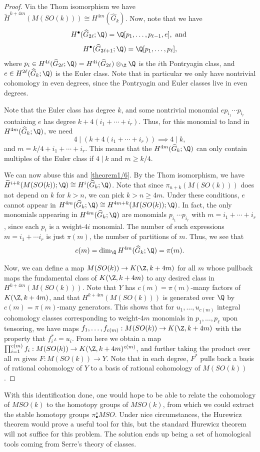 \begin{proof}
    Via the Thom isomorphism we have $\widetilde H^{k+4m}(M(SO(k)))\cong H^{4m}(\widehat G_k)$.
    Now, note that we have 
    \[H^\bullet(\widehat G_{2\ell};\Q)=\Q[p_1,\dots, p_{\ell-1},e],\text{ and }\]
    \[H^\bullet(\widehat G_{2\ell+1};\Q)=\Q[p_1,\dots, p_{\ell}],\]
    where $p_i\in H^{4i}(\widehat G_{2\ell};\Q)=H^{4i}(\widehat G_{2\ell})\otimes_\Z \Q$ is the $i$th Pontryagin class, and $e\in H^{2\ell}(\widehat G_k;\Q)$ is the Euler class. Note that in particular we only have nontrivial cohomology in even degrees, since the Pontryagin and Euler classes live in even degrees. 
    
    Note that the Euler class has degree $k$, and some nontrivial monomial $ep_{i_1}\cdots p_{i_r}$ containing $e$ has degree $k+4(i_1+\cdots +i_r)$. Thus, for this monomial to land in $H^{4m}(\widehat G_k;\Q)$, we need 
    \[4\mid (k+4(i_1+\cdots +i_r))\implies 4\mid k,\]
    and $m=k/4+i_1+\cdots+i_r$. This means that the $H^{4m}(\widehat G_k;\Q)$ can only contain multiples of the Euler class if $4\mid k$ and $m\geq k/4$.

    We can now abuse this and \cref{theorem1/6}. By the Thom isomorphism, we have $\widetilde H^{i+k}(M(SO(k));\Q)\cong H^i(\widehat G_k;\Q)$. Note that since $\pi_{n+k}(M(SO(k)))$ does not depend on $k$ for $k>n$, we can pick $k > n\geq 4m$. Under these conditions, $e$ cannot appear in $H^{4m}(\widehat G_k;\Q)\cong H^{4m+k}(M(SO(k));\Q)$. In fact, the only monomials appearing in $H^{4m}(\widehat G_k;\Q)$ are monomials $p_{i_1}\cdots p_{i_r}$ with $m=i_1+\cdots+i_r$, since each $p_i$ is a weight-$4i$ monomial. The number of such expressions $m=i_1+\cdots i_r$ is just $\pi(m)$, the number of partitions of $m$. Thus, we see that 
    \[c(m)=\dim_\Q H^{4m}(\widehat G_k;\Q)=\pi(m).\]

    Now, we can define a map $M(SO(k))\to K(\Z, k+4m)$ for all $m$ whose pullback maps the fundamental class of $K(\Z, k+4m)$ to any desired class in $H^{k+4m}(M(SO(k)))$. Note that $Y$ has $c(m)=\pi(m)$-many factors of $K(\Z, k+4m)$, and that $H^{k+4m}(M(SO(k)))$ is generated over $\Q$ by $c(m)=\pi(m)$-many generators. This shows that for $u_1,\dots, u_{c(m)}$ integral cohomology classes corresponding to weight-$4m$ monomials in $p_1,\dots, p_\ell$ upon tensoring, we have maps $f_1,\dots, f_{c(m)}:M(SO(k))\to K(\Z, k+4m)$ with the property that $f_i^*\iota=u_i$. From here we obtain a map $\prod_{i=1}^{c(m)} f_i:M(SO(k))\to K(\Z, k+4m)^{c(m)}$, and further taking the product over all $m$ gives $F:M(SO(k))\to Y$. Note that in each degree, $F^*$ pulls back a basis of rational cohomology of $Y$ to a basis of rational cohomology of $M(SO(k))$. 
\end{proof}
With this identification done, one would hope to be able to relate the cohomology of $MSO(k)$ to the homotopy groups of $MSO(k)$, from which we could extract the stable homotopy groups $\pi^s_\bullet MSO$. Under nice circumstances, the Hurewicz theorem would prove a useful tool for this, but the standard Hurewicz theorem will not suffice for this problem. The solution ends up being a set of homological tools coming from Serre's theory of classes.

